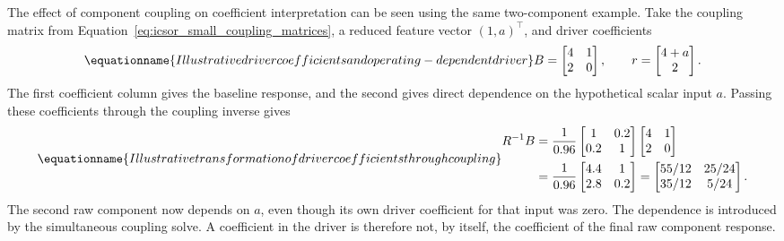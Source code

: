 The effect of component coupling on coefficient interpretation can be seen using the same two-component example. Take the coupling matrix from Equation~\eqref{eq:icsor_small_coupling_matrices}, a reduced feature vector \((1,a)^\top\), and driver coefficients
\begin{equation}
\equationname{Illustrative driver coefficients and operating-dependent driver}
\label{eq:icsor_small_driver_coefficient_matrix}
B=\begin{bmatrix}4&1\\2&0\end{bmatrix},
\qquad
r=\begin{bmatrix}4+a\\2\end{bmatrix}.
\end{equation}
The first coefficient column gives the baseline response, and the second gives direct dependence on the hypothetical scalar input \(a\). Passing these coefficients through the coupling inverse gives
\begin{equation}
\equationname{Illustrative transformation of driver coefficients through coupling}
\label{eq:icsor_small_back_projection}
\begin{aligned}
R^{-1}B
&=\frac{1}{0.96}
\begin{bmatrix}1&0.2\\0.2&1\end{bmatrix}
\begin{bmatrix}4&1\\2&0\end{bmatrix}\\
&=\frac{1}{0.96}\begin{bmatrix}4.4&1\\2.8&0.2\end{bmatrix}
=\begin{bmatrix}55/12&25/24\\35/12&5/24\end{bmatrix}.
\end{aligned}
\end{equation}
The second raw component now depends on \(a\), even though its own driver coefficient for that input was zero. The dependence is introduced by the simultaneous coupling solve. A coefficient in the driver is therefore not, by itself, the coefficient of the final raw component response.

